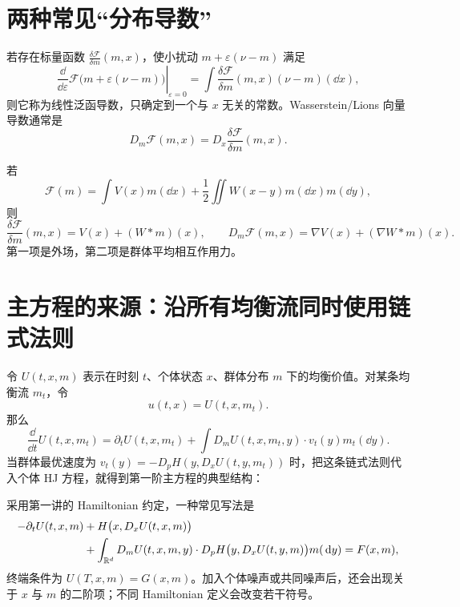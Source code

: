 \section{两种常见“分布导数”}

若存在标量函数 $\frac{\delta\mathcal F}{\delta m}(m,x)$，使小扰动 $m+\varepsilon(\nu-m)$ 满足
\[
\left.\frac{\dd}{\dd\varepsilon}\mathcal F\bigl(m+\varepsilon(\nu-m)\bigr)\right|_{\varepsilon=0}
=\int\frac{\delta\mathcal F}{\delta m}(m,x)(\nu-m)(\dd x),
\]
则它称为线性泛函导数，只确定到一个与 $x$ 无关的常数。Wasserstein/Lions 向量导数通常是
\[
D_m\mathcal F(m,x)=D_x\frac{\delta\mathcal F}{\delta m}(m,x).
\]

\begin{examplebox}[势能与相互作用能]
若
\[
\mathcal F(m)=\int V(x)m(\dd x)
+\frac12\iint W(x-y)m(\dd x)m(\dd y),
\]
则
\[
\frac{\delta\mathcal F}{\delta m}(m,x)
=V(x)+(W*m)(x),\qquad
D_m\mathcal F(m,x)=\nabla V(x)+(\nabla W*m)(x).
\]
第一项是外场，第二项是群体平均相互作用力。
\end{examplebox}

\section{主方程的来源：沿所有均衡流同时使用链式法则}

令 $U(t,x,m)$ 表示在时刻 $t$、个体状态 $x$、群体分布 $m$ 下的均衡价值。对某条均衡流 $m_t$，令
\[
u(t,x)=U(t,x,m_t).
\]
那么
\[
\frac{\dd}{\dd t}U(t,x,m_t)
=\partial_tU(t,x,m_t)
+\int D_mU(t,x,m_t,y)\cdot v_t(y)m_t(\dd y).
\]
当群体最优速度为 $v_t(y)=-D_pH(y,D_xU(t,y,m_t))$ 时，把这条链式法则代入个体 HJ 方程，就得到第一阶主方程的典型结构：

\begin{derivation}
采用第一讲的 Hamiltonian 约定，一种常见写法是
\[
\begin{aligned}
-\partial_tU(t,x,m)
&+H\bigl(x,D_xU(t,x,m)\bigr)\\
&+\int_{\mathbb{R}^d}D_mU(t,x,m,y)\cdot
D_pH\bigl(y,D_xU(t,y,m)\bigr)m(\,\mathrm{d} y)
=F(x,m),
\end{aligned}
\]
终端条件为 $U(T,x,m)=G(x,m)$。加入个体噪声或共同噪声后，还会出现关于 $x$ 与 $m$ 的二阶项；不同 Hamiltonian 定义会改变若干符号。
\end{derivation}

\begin{center}
\end{center}

